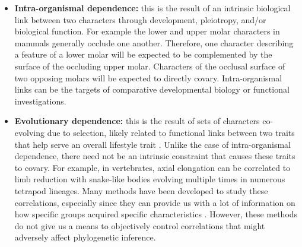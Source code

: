\documentclass[12pt,letterpaper]{article}
\begin{document}
\begin{itemize}
    \item \textbf{Intra-organismal dependence:} this is the result of an intrinsic biological link between two characters through development, pleiotropy, and/or biological function.
    For example the lower and upper molar characters in mammals generally occlude one another. 
    Therefore, one character describing a feature of a lower molar will be expected to be complemented by the surface of the occluding upper molar.
    Characters of the occlusal surface of two opposing molars will be expected to directly covary.
    Intra-organismal links can be the targets of comparative developmental biology \citep{goswami2010,kelly2010reduced,stoessel2013morphological,goswami2014macroevolutionary} or functional investigations. 

    \item \textbf{Evolutionary dependence:} this is the result of sets of characters co-evolving due to selection, likely related to functional links between two traits that help serve an overall lifestyle trait \citep{ClarkeMiddleton2008}. 
    Unlike the case of intra-organismal dependence, there need not be an intrinsic constraint that causes these traits to covary.
    For example, in vertebrates, axial elongation can be correlated to limb reduction with snake-like bodies evolving multiple times in numerous tetrapod lineages.
    Many methods have been developed to study these correlations, especially since they can provide us with a lot of information on how specific groups acquired specific characteristics \citep{Lande1983,Maddison1990,Pagel1994,Pagel2006,Grabowski2016}.
    However, these methods do not give us a means to objectively control correlations that might adversely affect phylogenetic inference.


\end{itemize}
\end{document}
